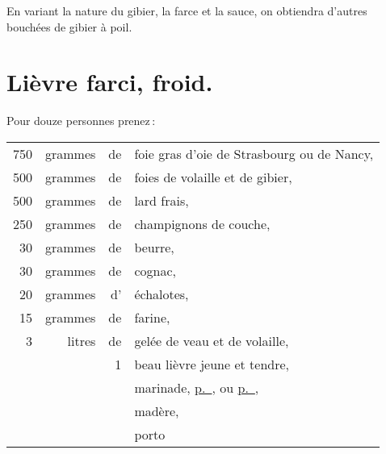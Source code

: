 \sk

En variant la nature du gibier, la farce et la sauce, on obtiendra d'autres
bouchées de gibier à poil.

\section*{\centering Lièvre farci, froid.}
{}

Pour douze personnes prenez :

\footnotesize
\begin{longtable}{rrrp{16em}}
    750 & grammes & de & foie gras d'oie de Strasbourg ou de Nancy,                                       \\
    500 & grammes & de & foies de volaille et de gibier,                                                  \\
    500 & grammes & de & lard frais,                                                                      \\
    250 & grammes & de & champignons de couche,                                                           \\
     30 & grammes & de & beurre,                                                                          \\
     30 & grammes & de & cognac,                                                                          \\
     20 & grammes & d' & échalotes,                                                                       \\
     15 & grammes & de & farine,                                                                          \\
      3 &  litres & de & gelée de veau et de volaille,                                                    \\
        &         &  1 & beau lièvre jeune et tendre,                                                     \\
        &         &    & marinade, \hyperlink{p0660}{p. \pageref{pg0660}}, ou \hyperlink{p0669}{p. \pageref{pg0669}}, \\
        &         &    & madère,                                                                          \\
        &         &    & porto                                                                            \\

\end{longtable}
